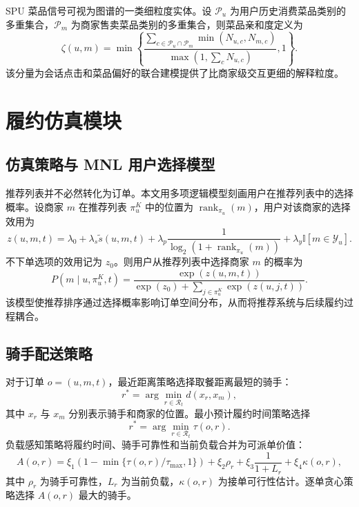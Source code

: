 \documentclass[12pt,a4paper]{article}
\begin{document}
    SPU 菜品信号可视为图谱的一类细粒度实体。设 $\mathcal{P}_u$ 为用户历史消费菜品类别的多重集合，$\mathcal{P}_m$ 为商家售卖菜品类别的多重集合，则菜品亲和度定义为
    \begin{equation}
        \zeta(u,m)=\min\left\{\frac{\sum_{c\in\mathcal{P}_u\cap\mathcal{P}_m}\min\left(N_{u,c},N_{m,c}\right)}{\max\left(1,\sum_c N_{u,c}\right)},1\right\}.
    \end{equation}
    该分量为会话点击和菜品偏好的联合建模提供了比商家级交互更细的解释粒度。

    \section{履约仿真模块}

    \subsection{仿真策略与 MNL 用户选择模型}

    推荐列表并不必然转化为订单。本文用多项逻辑模型刻画用户在推荐列表中的选择概率\cite{luce1959choice,mcfadden1974logit}。设商家 $m$ 在推荐列表 $\pi_u^K$ 中的位置为 $\operatorname{rank}_{\pi_u}(m)$，用户对该商家的选择效用为
    \begin{equation}
        z(u,m,t)=\lambda_0+\lambda_s\widetilde{s}(u,m,t)+\lambda_p\frac{1}{\log_2(1+\operatorname{rank}_{\pi_u}(m))}+\lambda_y\mathbb{I}[m\in\mathcal{Y}_u].
    \end{equation}
    不下单选项的效用记为 $z_0$。则用户从推荐列表中选择商家 $m$ 的概率为
    \begin{equation}
        P(m\mid u,\pi_u^K,t)=\frac{\exp(z(u,m,t))}{\exp(z_0)+\sum_{j\in\pi_u^K}\exp(z(u,j,t))}.
    \end{equation}
    该模型使推荐排序通过选择概率影响订单空间分布，从而将推荐系统与后续履约过程耦合。

    \subsection{骑手配送策略}

    对于订单 $o=(u,m,t)$，最近距离策略选择取餐距离最短的骑手：
    \begin{equation}
        r^*=\arg\min_{r\in\mathcal{R}_t} d(x_r,x_m),
    \end{equation}
    其中 $x_r$ 与 $x_m$ 分别表示骑手和商家的位置。最小预计履约时间策略选择
    \begin{equation}
        r^*=\arg\min_{r\in\mathcal{R}_t}\tau(o,r).
    \end{equation}
    负载感知策略将履约时间、骑手可靠性和当前负载合并为可派单价值：
    \begin{equation}
        A(o,r)=\xi_1\left(1-\min\{\tau(o,r)/\tau_{\max},1\}\right)+\xi_2\rho_r+\xi_3\frac{1}{1+L_r}+\xi_4\kappa(o,r),
    \end{equation}
    其中 $\rho_r$ 为骑手可靠性，$L_r$ 为当前负载，$\kappa(o,r)$ 为接单可行性估计。逐单贪心策略选择 $A(o,r)$ 最大的骑手。
\end{document}
